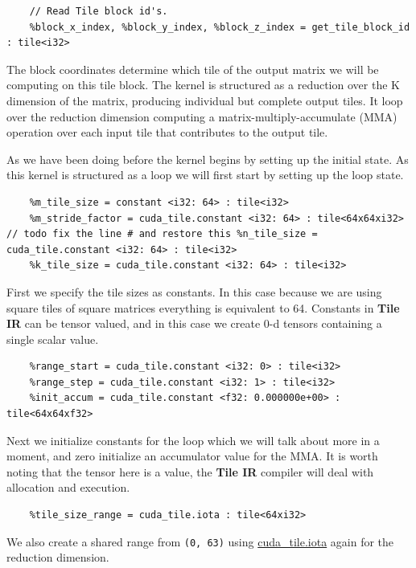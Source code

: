 \documentclass{article}
\begin{document}
\begin{lstlisting}
    // Read Tile block id's.
    %block_x_index, %block_y_index, %block_z_index = get_tile_block_id : tile<i32>
\end{lstlisting}

The block coordinates determine which tile of the output matrix we will be computing on this tile block. The kernel is structured as a reduction over the K dimension of the matrix, producing individual but complete output tiles. It loop over the reduction dimension computing a matrix-multiply-accumulate (MMA) operation over each input tile that contributes to the output tile.


As we have been doing before the kernel begins by setting up the initial state. As this kernel is structured as a loop we will first start by setting up the loop state.


\begin{lstlisting}
    %m_tile_size = constant <i32: 64> : tile<i32>
    %m_stride_factor = cuda_tile.constant <i32: 64> : tile<64x64xi32> // todo fix the line # and restore this %n_tile_size = cuda_tile.constant <i32: 64> : tile<i32>
    %k_tile_size = cuda_tile.constant <i32: 64> : tile<i32>
\end{lstlisting}

First we specify the tile sizes as constants. In this case because we are using square tiles of square matrices everything is equivalent to 64. Constants in \textbf{Tile IR} can be tensor valued, and in this case we create 0-d tensors containing a single scalar value.


\begin{lstlisting}
    %range_start = cuda_tile.constant <i32: 0> : tile<i32>
    %range_step = cuda_tile.constant <i32: 1> : tile<i32>
    %init_accum = cuda_tile.constant <f32: 0.000000e+00> : tile<64x64xf32>
\end{lstlisting}

Next we initialize constants for the loop which we will talk about more in a moment, and zero initialize an accumulator value for the MMA. It is worth noting that the tensor here is a value, the \textbf{Tile IR} compiler will deal with allocation and execution.


\begin{lstlisting}
    %tile_size_range = cuda_tile.iota : tile<64xi32>
\end{lstlisting}

We also create a shared range from \texttt{(0, 63)} using \href{https://docs.nvidia.com/cuda/tile-ir/latest/sections/operations.html#op-cuda-tile-iota}{cuda\_tile.iota} again for the reduction dimension.
\end{document}
